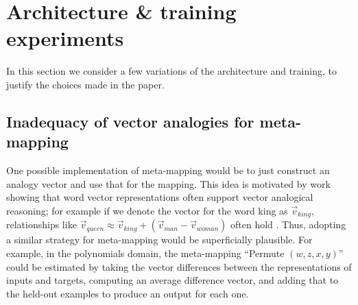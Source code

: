 
\section{Architecture \& training experiments} \label{app_lesion_results}
In this section we consider a few variations of the architecture and training, to justify the choices made in the paper. \par

\subsection{Inadequacy of vector analogies for meta-mapping} \label{supp_sec:HoMM:vector_analogies_inadequate}

One possible implementation of meta-mapping would be to just construct an analogy vector and use that for the mapping. This idea is motivated by work showing that word vector representations often support vector analogical reasoning; for example if we denote the vector for the word king as \(\vec{v}_{king}\), relationships like \(\vec{v}_{queen} \approx \vec{v}_{king} + \left(\vec{v}_{man} - \vec{v}_{woman} \right)\) often hold \citep{Mikolov2013}. Thus, adopting a similar strategy for meta-mapping would be superficially plausible. For example, in the polynomials domain, the meta-mapping ``Permute \((w, z, x, y)\)'' could be estimated by taking the vector differences between the representations of inputs and targets, computing an average difference vector, and adding that to the held-out examples to produce an output for each one.

